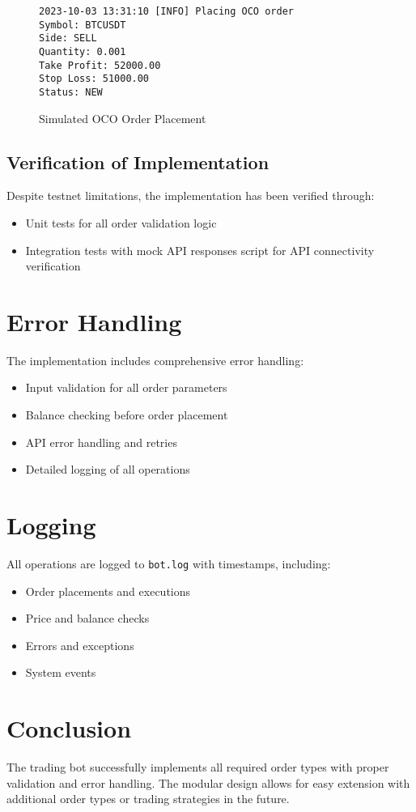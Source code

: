 \documentclass[12pt,a4paper]{article}
\begin{document}
\begin{figure}[H]
    \centering
    \begin{verbatim}
2023-10-03 13:31:10 [INFO] Placing OCO order
Symbol: BTCUSDT
Side: SELL
Quantity: 0.001
Take Profit: 52000.00
Stop Loss: 51000.00
Status: NEW
    \end{verbatim}
    \caption{Simulated OCO Order Placement}
\end{figure}

\subsection{Verification of Implementation}
Despite testnet limitations, the implementation has been verified through:
\begin{itemize}
    \item Unit tests for all order validation logic
    \item Integration tests with mock API responses
     script for API connectivity verification
\end{itemize}

\section{Error Handling}
The implementation includes comprehensive error handling:
\begin{itemize}
    \item Input validation for all order parameters
    \item Balance checking before order placement
    \item API error handling and retries
    \item Detailed logging of all operations
\end{itemize}

\section{Logging}
All operations are logged to \texttt{bot.log} with timestamps, including:
\begin{itemize}
    \item Order placements and executions
    \item Price and balance checks
    \item Errors and exceptions
    \item System events
\end{itemize}

\section{Conclusion}
The trading bot successfully implements all required order types with proper validation and error handling. The modular design allows for easy extension with additional order types or trading strategies in the future.
\end{document}
